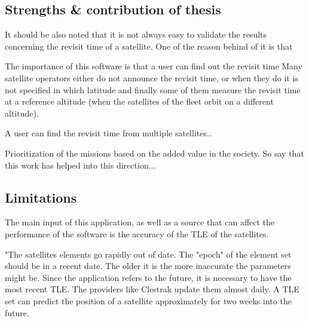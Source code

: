 \bigskip
\subsection{Strengths \& contribution of thesis}
\bigskip

It should be also noted that it is not always easy to validate the results concerning the revisit time of a satellite. One of the reason behind of it is that 

The importance of this software is that a user can find out the revisit time Many satellite operators either do not announce the revisit time, or when they do it is not specified in which latitude and finally some of them measure the revisit time at a reference altitude (when the satellites of the fleet orbit on a different altitude).

A user can find the revisit time from multiple satellites..

Prioritization of the missions based on the added value in the society. So say that this work has helped into this direction...


\bigskip
\subsection{Limitations} %
\bigskip

The main input of this application, as well as a source that can affect the performance of the software is the accuracy of the TLE of the satellites.

"The satellites elements go rapidly out of date. The "epoch" of the element set should be in a recent date. The older it is the more inaccurate the parameters might be. Since the application refers to the future, it is necessary to have the most recent TLE. The providers like Clestrak update them almost daily. A TLE set can predict the position of a satellite approximately for  two weeks into the future.

